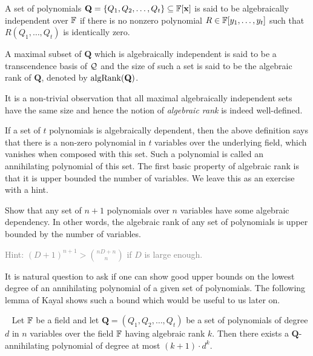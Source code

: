 \begin{definition}
A set of polynomials $\mathbf{Q} = \{Q_1, Q_2, \ldots, Q_t\} \subseteq \mathbb{F}[\mathbf{x}]$ is said to be algebraically independent over $\mathbb{F}$ if there is no nonzero polynomial $R \in \mathbb{F}[y_1,\ldots, y_t]$ such that $R(Q_1, \ldots, Q_t)$ is identically zero. 

A maximal subset of $\mathbf{Q}$ which is algebraically independent is said to be a transcendence basis of $\cal Q$ and the size of such a set is said to be the algebraic rank of $\mathbf{Q}$, denoted by $\operatorname{\mathrm{algRank}}(\mathbf{Q})$. 
\end{definition}

It is a non-trivial observation that all maximal algebraically independent sets have the same size and hence the notion of \emph{algebraic rank} is indeed well-defined. 

\medskip

If a set of $t$ polynomials is algebraically dependent, then the above definition says that there is a non-zero polynomial in $t$ variables over the underlying field, which vanishes when composed with this set. Such a polynomial is called an annihilating polynomial of this set. The first basic property of algebraic rank is that it is upper bounded the number of variables. We leave this as an exercise with a hint. \\

\begin{exercise}
Show that any set of $n+1$ polynomials over $n$ variables have some algebraic dependency. In other words, the algebraic rank of any set of polynomials is upper bounded by the number of variables.

\textcolor{Gray}{Hint: $(D+1)^{n+1} > \binom{nD+n}{n}$ if $D$ is large enough.}
\end{exercise}

It is natural question to ask if one can show good upper bounds on the lowest degree of an annihilating polynomial of a given set of polynomials. The following lemma of Kayal shows such a bound which would be useful to us later on. 

\begin{lemma}~\label{lem:degree upper bound for annihilating poly}
Let $\mathbb{F}$ be a field and let $\mathbf{Q} = (Q_1, Q_2, \ldots, Q_t)$ be a set of polynomials of degree $d$ in $n$ variables over the field $\mathbb{F}$ having algebraic rank $k$. Then there exists a $\mathbf{Q}$-annihilating polynomial
of degree at most $(k+1)\cdot d^k$.
\end{lemma}  

